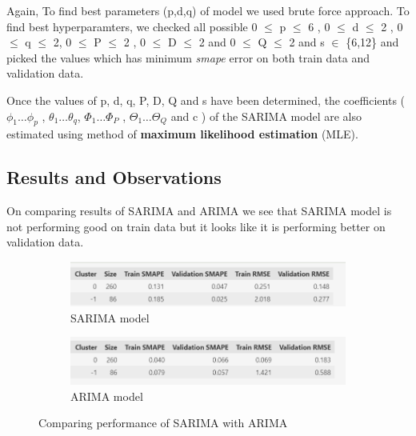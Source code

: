 \documentclass{article}
\begin{document}
Again, To find best parameters (p,d,q) of model we used brute force approach. To find best hyperparamters, we checked all possible 0 $\le$ p $\le$ 6 , 0 $\le$ d $\le$ 2 , 0 $\le$ q $\le$ 2, 0 $\le$ P $\le$ 2 , 0 $\le$ D $\le$ 2 and 0 $\le$ Q $\le$ 2 and s $\in$ \{6,12\} and picked the values which has minimum \textit{smape} error on both train data and validation data.  

\vspace{1em}
Once the values of p, d, q, P, D, Q and s have been determined, the coefficients ($\phi_1 \ldots \phi_p$ , $\theta_1 \ldots \theta_q$, $\Phi_1 \ldots \Phi_P$ , $\Theta_1 \ldots \Theta_Q$ and c ) of the SARIMA model are also estimated using method of \textbf{maximum likelihood estimation} (MLE).

\vspace{1em}
\subsection{Results and Observations}

On comparing results of SARIMA and ARIMA we see that SARIMA model is not performing
good on train data but it looks like it is performing better on validation data.


\vspace{1em}

\begin{figure}[h]
	\centering
	\vspace{1em}
	\begin{subfigure}{0.6\textwidth}
		\includegraphics[width=\linewidth]{images/sarima_results}
		\caption{SARIMA model}
		\label{fig:arima}
	\end{subfigure}
	
	\begin{subfigure}{0.6\textwidth}
		\centering
		\includegraphics[width=\linewidth]{images/benchmark_sarima_with_arima}
		\caption{ARIMA model}
		\label{fig:sarima_vs_arima}
	\end{subfigure}
	\caption{Comparing performance of SARIMA with ARIMA}
	\label{fig:sarima_arima_both}
\end{figure}
\end{document}
